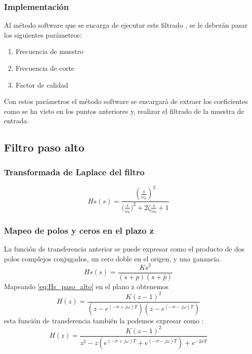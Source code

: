 \documentclass[titlepage]{article}
\begin{document}
\subsubsection{Implementación}
Al método software que se encarga de ejecutar este filtrado , se le deberán pasar los siguientes parámetros:
\begin{enumerate}
\item Frecuencia de muestro 
\item Frecuencia de corte
\item Factor de calidad
\end{enumerate}
Con estos parámetros el método software se encargará de extraer los coeficientes como se ha visto en los puntos anteriores y, realizar el filtrado de la muestra de entrada.









\subsection{Filtro paso alto}
\subsubsection{Transformada de Laplace del filtro}
\begin{equation}
Hs(s)=\frac{(\displaystyle\frac{s}{\omega_0})^2}{\displaystyle{(\frac{s}{\omega_0}})^2+2\zeta\frac{s}{\omega_0}+1}
\end{equation}
\subsubsection{Mapeo de polos y ceros en el plazo z}
La función de transferencia anterior se puede expresar como el producto de dos polos complejos conjugados, un cero doble en el origen, y una ganancia.
\begin{equation}
\label{eq:Hs_paso_alto}Hs(s)=\frac{Ks^2}{\displaystyle(s+p)(s+\hat{p})}
\end{equation}
Mapeando \ref{eq:Hs_paso_alto} en el plano z obtenemos
\begin{equation}
H(z)=\frac{K(z-1)^2}{\displaystyle(z-e^{(-\sigma+j\omega)T})(z-e^{(-\sigma-j\omega)T})}
\end{equation}
esta función de transferencia también la podemos expresar como :
\begin{equation}
H(z)=\frac{K(z-1)^2}{z^2-z(e^{(-\sigma+j\omega)T}+e^{(-\sigma-j\omega)T}) + e^{-2{\sigma}T}}
\end{equation}
\end{document}
